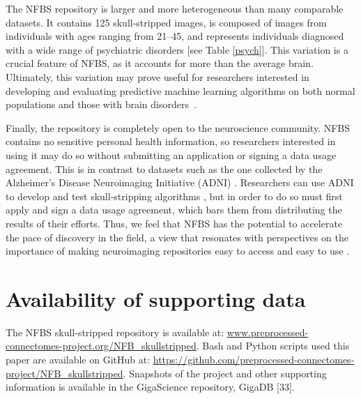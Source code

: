 The NFBS repository is larger and more heterogeneous than many comparable datasets. It contains 125 skull-stripped images, is composed of images from individuals with ages ranging from 21--45, and represents individuals diagnosed with a wide range of psychiatric disorders [see Table \ref{psych}]. This variation is a crucial feature of NFBS, as it accounts for more than the average brain. Ultimately, this variation may prove useful for researchers interested in developing and evaluating predictive machine learning algorithms on both normal populations and those with brain disorders~\cite{gabrieli2015prediction}.

Finally, the repository is completely open to the neuroscience community. NFBS contains no sensitive personal health information, so researchers interested in using it may do so without submitting an application or signing a data usage agreement. This is in contrast to datasets such as the one collected by the Alzheimer's Disease Neuroimaging Initiative (ADNI) \cite{pmid17476317}. Researchers can use ADNI to develop and test skull-stripping algorithms \cite{pmid21195780}, but in order to do so must first apply and sign a data usage agreement, which bars them from distributing the results of their efforts. Thus, we feel that NFBS has the potential to accelerate the pace of discovery in the field, a view that resonates with perspectives on the importance of making neuroimaging repositories easy to access and easy to use \cite{Nichols054262}.

\section*{Availability of supporting data}
The NFBS skull-stripped repository is available at: \DIFdelbegin %
\DIFdelend \DIFaddbegin \url{www.preprocessed-connectomes-project.org/NFB\_skullstripped}\DIFaddend . Bash and Python scripts used \DIFdelbegin {}\DIFdelend \DIFaddbegin {}\DIFaddend this paper are available on GitHub at: \url{https://github.com/preprocessed-connectomes-project/NFB\_skullstripped}. Snapshots of the project and other supporting information is available in the GigaScience repository, GigaDB [33].
